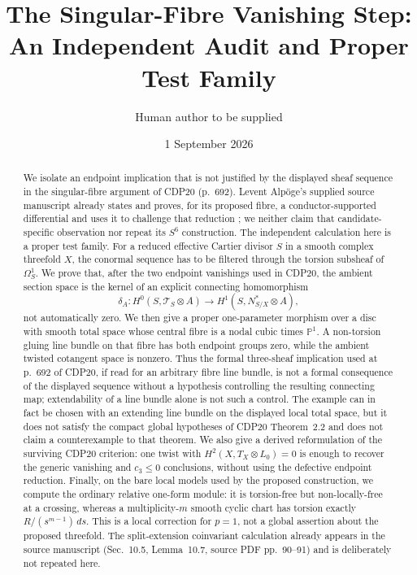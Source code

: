 \documentclass[11pt]{amsart}
\title[An independent test family]{The Singular-Fibre Vanishing Step: An Independent Audit and Proper Test Family}
\author{Human author to be supplied}
\date{1 September 2026}
\renewcommand{\P}{\mathbb P}
\theoremstyle{plain}
\theoremstyle{definition}
\theoremstyle{remark}
\begin{document}
\begin{abstract}
We isolate an endpoint implication that is not justified by the displayed
sheaf sequence in the singular-fibre argument of CDP20 (p.~692).
Levent Alp{\"o}ge's supplied source
manuscript already states and proves, for its proposed fibre, a
conductor-supported differential and uses it to challenge that reduction
\cite[Sec.~10.2, Lemma~10.3, source PDF pp.~87--88]{S6Source}; we neither
claim that candidate-specific observation nor repeat its $S^6$ construction.
The independent calculation here is a proper
test family.
For a reduced effective
Cartier divisor $S$ in a smooth complex threefold $X$, the conormal sequence
has to be filtered through the torsion subsheaf of $\Omega^1_S$.  We prove
that, after the two endpoint vanishings used in CDP20, the ambient section
space is the kernel of an explicit connecting homomorphism
\[
\delta_A:H^0(S,\mathscr T_S\otimes A)\longrightarrow
H^1(S,N^*_{S/X}\otimes A),
\]
not automatically zero.  We then give a proper one-parameter morphism over a
disc with smooth total space whose central fibre is a nodal cubic times
$\P^1$.  A
non-torsion gluing line bundle on that fibre has both endpoint groups zero,
while the ambient twisted cotangent space is nonzero.  Thus the formal
  three-sheaf implication used at p.~692 of CDP20, if read for an arbitrary
  fibre line bundle, is not a formal consequence of the displayed sequence
  without a hypothesis controlling the resulting connecting map; extendability of a
  line bundle alone is not such a control.  The example can in fact be chosen
  with an extending line bundle on the displayed local total space, but it
  does not satisfy the compact global hypotheses of CDP20 Theorem~2.2 and does
  not claim a
counterexample to that theorem.  We also give a derived reformulation of the
surviving CDP20 criterion: one twist with $H^2(X,T_X\otimes L_0)=0$ is enough
to recover the
generic vanishing and $c_3\leq0$ conclusions, without using the defective
endpoint reduction.  Finally, on the bare local models used by the proposed
construction, we compute the ordinary relative one-form module: it is
torsion-free but non-locally-free at a crossing, whereas a multiplicity-$m$
  smooth cyclic chart has torsion exactly $R/(s^{m-1})\,ds$.  This is a local correction
for $p=1$, not a global assertion about the proposed threefold.  The
  split-extension coinvariant calculation already appears in the source
  manuscript (Sec.~10.5, Lemma~10.7, source PDF pp.~90--91) and is deliberately
  not repeated here.
\end{abstract}
\end{document}
